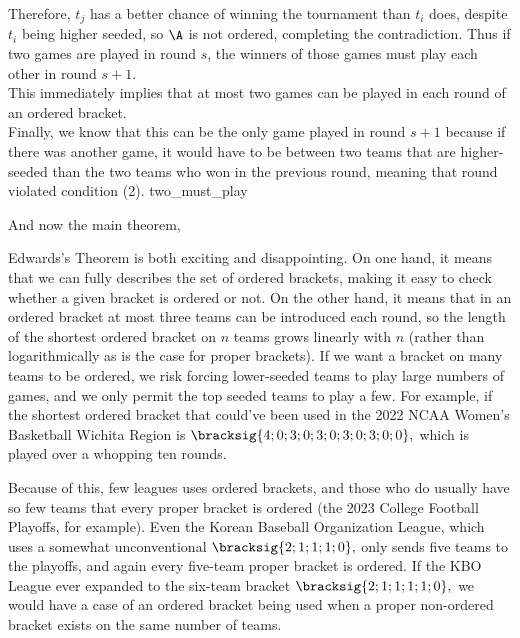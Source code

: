 {{    Therefore, $t_j$ has a better chance of winning the tournament than $t_i$ does, despite $t_i$ being higher seeded, so $\A$ is not ordered, completing the contradiction. Thus if two games are played in round $s$, the winners of those games must play each other in round $s+1.$\\

    This immediately implies that at most two games can be played in each round of an ordered bracket.\\
    
    Finally, we know that this can be the only game played in round $s+1$ because if there was another game, it would have to be between two teams that are higher-seeded than the two teams who won in the previous round, meaning that round violated condition (2).
}{two_must_play}

And now the main theorem,


Edwards's Theorem is both exciting and disappointing. On one hand, it means that we can fully describes the set of ordered brackets, making it easy to check whether a given bracket is ordered or not. On the other hand, it means that in an ordered bracket at most three teams can be introduced each round, so the length of the shortest ordered bracket on $n$ teams grows linearly with $n$ (rather than logarithmically as is the case for proper brackets). If we want a bracket on many teams to be ordered, we risk forcing lower-seeded teams to play large numbers of games, and we only permit the top seeded teams to play a few. For example, if the shortest ordered bracket that could've been used in the 2022 NCAA Women's Basketball Wichita Region is $\bracksig{4; 0; 3; 0; 3; 0; 3; 0; 3; 0; 0},$ which is played over a whopping ten rounds.


Because of this, few leagues uses ordered brackets, and those who do usually have so few teams that every proper bracket is ordered (the 2023 College Football Playoffs, for example). Even the Korean Baseball Organization League, which uses a somewhat unconventional $\bracksig{2; 1; 1; 1; 0},$ only sends five teams to the playoffs, and again every five-team proper bracket is ordered. If the KBO League ever expanded to the six-team bracket $\bracksig{2; 1; 1; 1; 1; 0},$ we would have a case of an ordered bracket being used when a proper non-ordered bracket exists on the same number of teams.
}